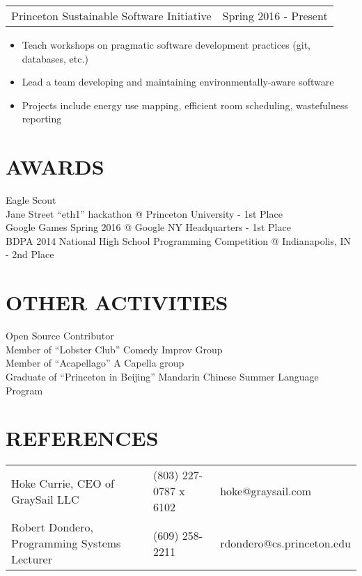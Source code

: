 \documentclass[margin]{res}
\begin{document}
\begin{resume}
    \begin{tabular}{p{3.5in} p{3in}}
        Princeton Sustainable Software Initiative & Spring 2016 - Present
    \end{tabular}
    \begin{itemize} \itemsep -2pt
        \item Teach workshops on pragmatic software development practices (git, databases, etc.)
        \item Lead a team developing and maintaining environmentally-aware software
        \item Projects include energy use mapping, efficient room scheduling, wastefulness reporting
    \end{itemize}

\section{AWARDS}
            Eagle Scout \\
            Jane Street ``eth1'' hackathon @ Princeton University - 1st Place \\
            Google Games Spring 2016 @ Google NY Headquarters - 1st Place \\
            BDPA 2014 National High School Programming Competition @ Indianapolis, IN - 2nd Place
 
\section{OTHER ACTIVITIES}
            Open Source Contributor \\
            Member of ``Lobster Club'' Comedy Improv Group\\
            Member of ``Acapellago'' A Capella group\\
            Graduate of ``Princeton in Beijing'' Mandarin Chinese Summer Language Program

\section{REFERENCES}
    \hspace*{-.40in}
    \begin{tabular}{p{2.75in} p{1.25in} p{2in}}
            Hoke Currie, CEO of GraySail LLC & (803) 227-0787 x 6102 & hoke@graysail.com \\
            Robert Dondero, Programming Systems Lecturer & (609) 258-2211 & rdondero@cs.princeton.edu
    \end{tabular}
 

 
\end{resume} 
\end{document}
